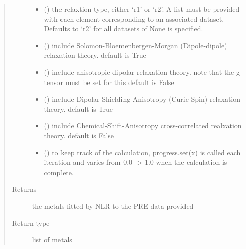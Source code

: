 \documentclass[a4paper,10pt,english,openany,oneside]{sphinxmanual}
\begin{document}
\begin{fulllineitems}
\begin{quote}
\begin{description}
\begin{itemize}
\item {} 
 (\sphinxstyleliteralemphasis{\sphinxupquote{, }}) \textendash{} the relaxtion type, either ‘r1’ or ‘r2’. A list must be provided with
each element corresponding to an associated dataset.
Defaults to ‘r2’ for all datasets of None is specified.

\item {} 
 (\sphinxstyleliteralemphasis{\sphinxupquote{, }}) \textendash{} include Solomon-Bloemenbergen-Morgan (Dipole-dipole) relaxation theory.
default is True

\item {} 
 (\sphinxstyleliteralemphasis{\sphinxupquote{, }}) \textendash{} include anisotropic dipolar relaxation theory.
note that the g-tensor must be set for this
default is False

\item {} 
 (\sphinxstyleliteralemphasis{\sphinxupquote{, }}) \textendash{} include Dipolar-Shielding-Anisotropy (Curie Spin) relaxation theory.
default is True

\item {} 
 (\sphinxstyleliteralemphasis{\sphinxupquote{, }}) \textendash{} include Chemical-Shift-Anisotropy cross-correlated realxation theory.
default is False

\item {} 
 (\sphinxstyleliteralemphasis{\sphinxupquote{, }}) \textendash{} to keep track of the calculation, progress.set(x) is called each
iteration and varies from 0.0 -\textgreater{} 1.0 when the calculation is complete.

\end{itemize}

\item[{Returns}] \leavevmode
{} \textendash{} the metals fitted by NLR to the PRE data provided

\item[{Return type}] \leavevmode
list of metals

\end{description}\end{quote}

\end{fulllineitems}
\end{document}
